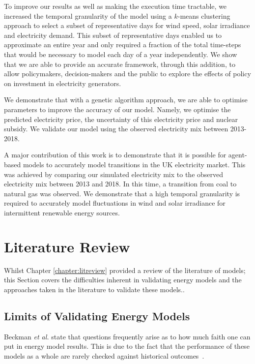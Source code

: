 To improve our results as well as making the execution time tractable, we increased the temporal granularity of the model using a $k$-means clustering approach to select a subset of representative days for wind speed, solar irradiance and electricity demand. This subset of representative days enabled us to approximate an entire year and only required a fraction of the total time-steps that would be necessary to model each day of a year independently. We show that we are able to provide an accurate framework, through this addition, to allow policymakers, decision-makers and the public to explore the effects of policy on investment in electricity generators. 

We demonstrate that with a genetic algorithm approach, we are able to optimise parameters to improve the accuracy of our model. Namely, we optimise the predicted electricity price, the uncertainty of this electricity price and nuclear subsidy. We validate our model using the observed electricity mix between 2013-2018.

A major contribution of this work is to demonstrate that it is possible for agent-based models to accurately model transitions in the UK electricity market. This was achieved by comparing our simulated electricity mix to the observed electricity mix between 2013 and 2018. In this time, a transition from coal to natural gas was observed. We demonstrate that a high temporal granularity is required to accurately model fluctuations in wind and solar irradiance for intermittent renewable energy sources.


\clearpage
\section{Literature Review}
\label{elecsim:sec:litreview}

Whilst Chapter \ref{chapter:litreview} provided a review of the literature of models; this Section covers the difficulties inherent in validating energy models and the approaches taken in the literature to validate these models..

\subsection{Limits of Validating Energy Models}

Beckman \textit{et al.} state that questions frequently arise as to how much faith one can put in energy model results. This is due to the fact that the performance of these models as a whole are rarely checked against historical outcomes~\cite{Beckman2011}.



